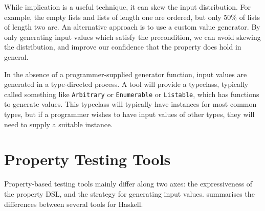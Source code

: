 While implication is a useful technique, it can skew the input
distribution.  For example, the empty lists and lists of length one
are ordered, but only 50\% of lists of length two are.  An alternative
approach is to use a custom value generator.  By only generating input
values which satisfy the precondition, we can avoid skewing the
distribution, and improve our confidence that the property does hold
in general.

In the absence of a programmer-supplied generator function, input
values are generated in a type-directed process.  A tool will provide
a typeclass, typically called something like \verb|Arbitrary| or
\verb|Enumerable| or \verb|Listable|, which has functions to generate
values.  This typeclass will typically have instances for most common
types, but if a programmer wishes to have input values of other types,
they will need to supply a suitable instance.

\section{Property Testing Tools}
\label{sec:property_testing-tools}

Property-based testing tools mainly differ along two axes: the
expressiveness of the property DSL, and the strategy for generating
input values.   summarises the differences between
several tools for Haskell.

\begingroup
\newcommand{\YY}{\CIRCLE}
\newcommand{\NN}{\Circle}
\newcommand{\YN}{\LEFTcircle}
\newcommand{\QQ}{\NN$^p$}

